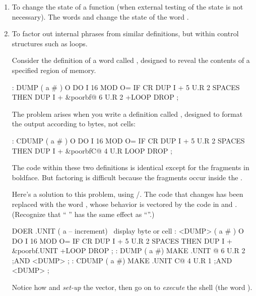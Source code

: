 \begin{enumerate}
\item To change the state of a function (when external testing of the state is not
necessary). The words  and  change the state of
the word .

\item To factor out internal phrases from similar definitions, but within control
structures such as loops.

Consider the definition of a word called , designed to reveal the
contents of a specified region of memory.


\begin{Code}[commandchars=\&\{\}]
: DUMP  ( a # )
   O DO  I 16 MOD O= IF  CR  DUP I +  5 U.R  2 SPACES  THEN
   DUP I +  &poorbf{@ 6 U.R  2 +LOOP}  DROP ;
\end{Code}
The problem arises when you write a definition called , designed to
format the output according to bytes, not cells:

\begin{Code}[commandchars=\&\{\}]
: CDUMP  ( a # )
   O DO  I 16 MOD O= IF  CR  DUP I +  5 U.R  2 SPACES  THEN
   DUP I +  &poorbf{C@  4 U.R  LOOP} DROP ;
\end{Code}

The code within these two definitions is identical except for the fragments
in boldface. But factoring is difficult because the fragments occur inside the
 .

Here's a solution to this problem, using
/. The code that changes has been replaced
with the word , whose behavior is vectored by the code in
 and . (Recognize that `` ''
has the same effect as ``''.)

\begin{Code}[commandchars=\&\{\}]
DOER .UNIT ( a -- increment)  \ display byte or cell
: <DUMP>  ( a # )
   O DO  I 16 MOD O= IF  CR  DUP I +  5 U.R  2 SPACES  THEN
   DUP I + &poorbf{.UNIT}  +LOOP  DROP ;
: DUMP   ( a #)  MAKE .UNIT  @  6 U.R  2 ;AND <DUMP> ;
: CDUMP ( a #)   MAKE .UNIT C@  4 U.R  1 ;AND <DUMP> ;
\end{Code}
Notice how  and  \emph{set-up} the vector, then go on to
\emph{execute} the shell (the word ).


\end{enumerate}
